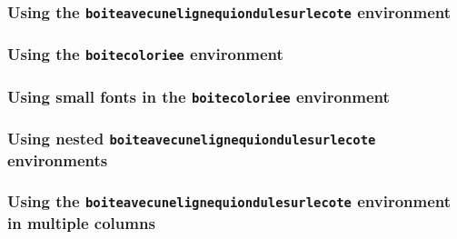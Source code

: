 \documentclass[a4paper,10pt]{article}
\begin{document}
\subsubsection*{Using the \texttt{boiteavecunelignequiondulesurlecote} environment}

\begin{boiteavecunelignequiondulesurlecote}
  \lipsum[1-3]
\end{boiteavecunelignequiondulesurlecote}

\subsubsection*{Using the \texttt{boitecoloriee} environment}

\bkcounttrue
\begin{boitecoloriee}
  \lipsum[1-2]
\end{boitecoloriee}

\subsubsection*{Using small fonts in the \texttt{boitecoloriee} environment}

\bkcounttrue
\begin{boitecoloriee}
  \small
  \lipsum[1-2]
\end{boitecoloriee}

\subsubsection*{Using nested \texttt{boiteavecunelignequiondulesurlecote} environments}

\bkcountfalse
\begin{boiteavecunelignequiondulesurlecote} 
  \lipsum[1]\bigskip
  \begin{boiteavecunelignequiondulesurlecote} 
    \lipsum[2]\bigskip
    \begin{boiteavecunelignequiondulesurlecote} 
      \lipsum[3]\bigskip
    \end{boiteavecunelignequiondulesurlecote}
    \lipsum[4]
  \end{boiteavecunelignequiondulesurlecote}
  \lipsum[5]
\end{boiteavecunelignequiondulesurlecote}

\subsubsection*{Using the \texttt{boiteavecunelignequiondulesurlecote} environment in multiple columns}

\bkcountfalse
\begin{multicols}{3}
  \lipsum[1]
  \begin{boiteavecunelignequiondulesurlecote} 
    \lipsum[2-4]
  \end{boiteavecunelignequiondulesurlecote}
  \lipsum[5]
  \begin{boiteavecunelignequiondulesurlecote} 
    \lipsum[6-8]
  \end{boiteavecunelignequiondulesurlecote}
  \lipsum[9-14]
\end{multicols}
\end{document}
